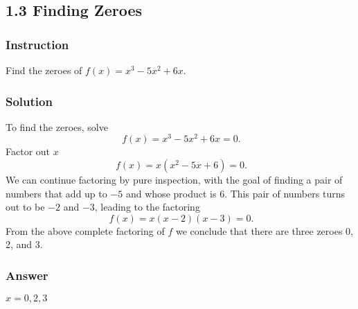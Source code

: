 \documentclass[letterpaper, oneside]{memoir}
\begin{document}
\subsection*{1.3 Finding Zeroes}

\subsubsection*{Instruction}

Find the zeroes of $ f(x) = x^3 - 5x^2 + 6x $.

\subsubsection*{Solution}

To find the zeroes, solve
$$ \phantom{.}
f(x) = x^3 - 5x^2 + 6x = 0
.$$
Factor out $ x $
$$ \phantom{.}
f(x) = x(x^2 - 5x + 6) = 0
.$$
We can continue factoring by pure inspection, with the goal of finding a pair of numbers that add up to $ -5 $ and whose product is $ 6 $. This pair of numbers turns out to be $ -2 $ and $ - 3 $, leading to the factoring
$$ \phantom{.}
f(x) = x(x - 2)(x - 3) = 0
.$$
From the above complete factoring of $ f $ we conclude that there are three zeroes 0, 2, and 3.

\subsubsection{Answer}

$ x = 0, 2, 3 $
\end{document}
